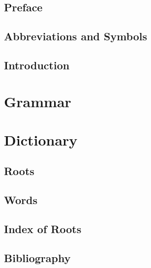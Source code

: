\documentclass[paper=6in:9in]{scrbook}
\title{\PIE{Leg'tik''om}{noasterisk, circumflex}}
\author{A Proto-Indo-European Dictionary}
\date{Author}
\begin{document}
\frontmatter
\maketitle

\newpage

\tableofcontents
\newpage

\chapter{Preface}

\chapter{Abbreviations and Symbols}

\mainmatter
\chapter{Introduction}

\part{Grammar}

\part{Dictionary}

\chapter{Roots}



\chapter{Words}

\backmatter
\chapter{Index of Roots}

\chapter{Bibliography}


\end{document}
